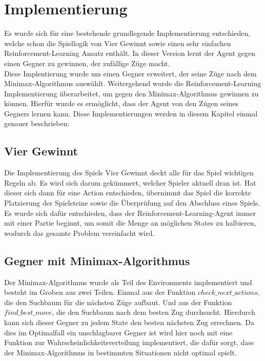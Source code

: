 \chapter{Implementierung}%

\label{cha:Implementierung}
Es wurde sich für eine bestehende grundlegende Implementierung entschieden, welche schon die Spiellogik von Vier Gewinnt sowie einen sehr einfachen Reinforcement-Learning Ansatz enthält. In dieser Version lernt der Agent gegen einen Gegner zu gewinnen, der zufällige Züge macht.\cite{connectfork}\\
Diese Implentierung wurde um einen Gegner erweitert, der seine Züge nach dem Minimax-Algorithmus auswählt.
Weitergehend wurde die Reinforcement-Learning Implementierung überarbeitet, um gegen den Minimax-Algorithmus gewinnen zu können.
Hierfür wurde es ermöglicht, dass der Agent von den Zügen seines Gegners lernen kann.
Diese Implementierungen werden in diesem Kapitel einmal genauer beschrieben:\\

\section{Vier Gewinnt}
Die Implementierung des Spiels Vier Gewinnt deckt alle für das Spiel wichtigen Regeln ab. Es wird sich darum gekümmert, welcher Spieler aktuell dran ist. Hat dieser sich dann für eine Action entschieden, übernimmt das Spiel die korrekte Platzierung der Spielsteine sowie die Überprüfung auf den Abschluss eines Spiels.\\ 
Es wurde sich dafür entschieden, dass der Reinforcement-Learning-Agent immer mit einer Partie beginnt, um somit die Menge an möglichen States zu halbieren, wodurch das gesamte Problem vereinfacht wird.

\section{Gegner mit Minimax-Algorithmus}
Der Minimax-Algorithmus wurde als Teil des Environments implementiert und besteht im Groben aus zwei Teilen. Einmal aus der Funktion $check\_next\_actions$, die den Suchbaum für die nächsten Züge aufbaut. Und aus der Funktion $find\_best\_move$, die den Suchbaum nach dem besten Zug durchsucht. Hierdurch kann sich dieser Gegner zu jedem State den besten nächsten Zug errechnen. Da dies im Optimalfall ein unschlagbarer Gegner ist wird hier noch mit eine Funktion zur Wahrscheinlichkeitsverteilung implementiert, die dafür sorgt, dass der Minimax-Algorithmus in bestimmten Situationen nicht optimal spielt.

